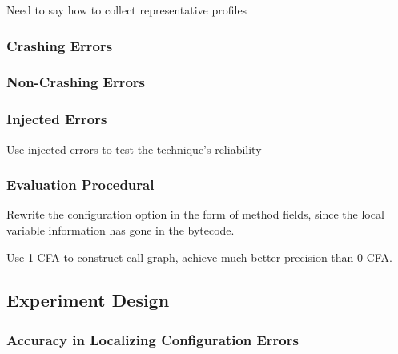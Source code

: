 Need to say how to collect representative profiles

\subsubsection{Crashing Errors}

\subsubsection{Non-Crashing Errors}

\subsubsection{Injected Errors}

Use injected errors to test the technique's reliability

\subsubsection{Evaluation Procedural}

Rewrite the configuration option in the form of method fields, since
the local variable information has gone in the bytecode.

Use 1-CFA to construct call graph, achieve much better precision
than 0-CFA. 

\subsection{Experiment Design}



\subsubsection{Accuracy in Localizing Configuration Errors}

